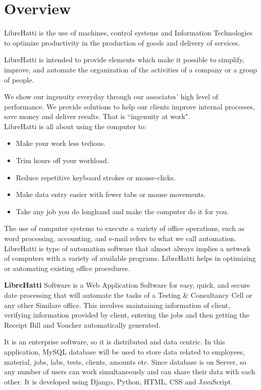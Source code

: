 \section{Overview}
LibreHatti is the use of machines, control systems and Information 
Technologies to optimize productivity in the production of goods and 
delivery of services.

LibreHatti is intended to provide elements which make it possible 
to simplify, improve, and automate the organization of the
activities of a company or a group of people.

We show our ingenuity everyday through our associates' high level of 
performance. We provide solutions to help our clients improve internal 
processes, save money and deliver results. That is ``ingenuity at work".\\

LibreHatti is all about using the computer to:
\begin{itemize}
\item Make your work less tedious. 
\item Trim hours off your workload.
\item Reduce repetitive keyboard strokes or mouse-clicks.
\item Make data entry easier with fewer tabs or mouse movements.
\item Take any job you do longhand and make the computer do it for you.
\end{itemize}

The use of computer systems to execute a variety of office operations, 
such as word processing, accounting, and e-mail refers to what we call 
automation. LibreHatti is type of automation software that almost always implies a network of 
computers with a variety of available programs. LibreHatti helps in 
optimizing or automating existing office procedures.

{\bf LibreHatti} Software is a Web Application Software for easy, quick, 
and secure date processing that will automate the tasks of a Testing 
\& Consultancy Cell or any other Similare office. This involves 
maintaining information of client, verifying information provided by 
client, entering the jobs and then getting the Receipt Bill and Voucher 
automatically generated.

It is an enterprise software, so it is distributed and data centric. 
In this application, MySQL database will be used to store data related 
to employees, material, jobs, labs, tests, clients, amounts etc. Since 
database is on Server, so any number of users can work simultaneously 
and can share their data with each other. It is developed using Django, 
Python, HTML, CSS and JavaScript.
